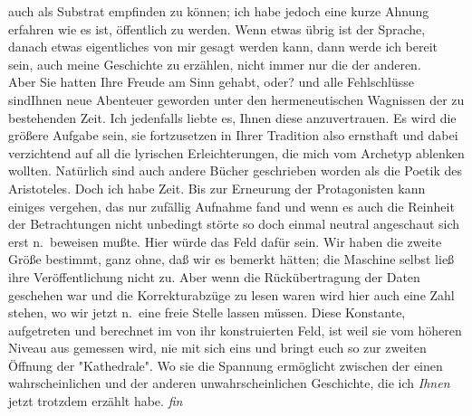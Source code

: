 \documentclass[
]{article}
\begin{document}
auch als Substrat empfinden zu können; ich habe jedoch eine kurze Ahnung
erfahren wie es ist, öffentlich zu werden. Wenn etwas übrig ist der
Sprache, danach etwas eigentliches von mir gesagt werden kann, dann
werde ich bereit sein, auch meine Geschichte zu erzählen, nicht immer
nur die der anderen.\\
Aber Sie hatten Ihre Freude am Sinn gehabt, oder? und alle Fehlschlüsse
sindIhnen neue Abenteuer geworden unter den hermeneutischen Wagnissen
der zu bestehenden Zeit. Ich jedenfalls liebte es, Ihnen diese
anzuvertrauen. Es wird die größere Aufgabe sein, sie fortzusetzen in
Ihrer Tradition also ernsthaft und dabei verzichtend auf all die
lyrischen Erleichterungen, die mich vom Archetyp ablenken wollten.
Natürlich sind auch andere Bücher geschrieben worden als die Poetik des
Aristoteles. Doch ich habe Zeit. Bis zur Erneurung der Protagonisten
kann einiges vergehen, das nur zufällig Aufnahme fand und wenn es auch
die Reinheit der Betrachtungen nicht unbedingt störte so doch einmal
neutral angeschaut sich erst n.~beweisen mußte. Hier würde das Feld
dafür sein. Wir haben die zweite Größe bestimmt, ganz ohne, daß wir es
bemerkt hätten; die Maschine selbst ließ ihre Veröffentlichung nicht zu.
Aber wenn die Rückübertragung der Daten geschehen war und die
Korrekturabzüge zu lesen waren wird hier auch eine Zahl stehen, wo wir
jetzt n.~eine freie Stelle lassen müssen. Diese Konstante, aufgetreten
und berechnet im von ihr konstruierten Feld, ist weil sie vom höheren
Niveau aus gemessen wird, nie mit sich eins und bringt euch so zur
zweiten Öffnung der "Kathedrale". Wo sie die Spannung ermöglicht
zwischen der einen wahrscheinlichen und der anderen unwahrscheinlichen
Geschichte, die ich \emph{Ihnen} jetzt trotzdem erzählt habe. \emph{fin}
\end{document}
